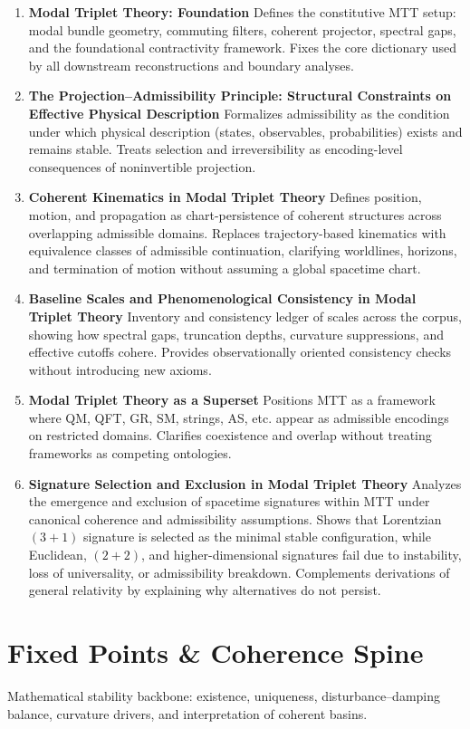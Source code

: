 \documentclass[11pt]{article}
\begin{document}
\begin{enumerate}[leftmargin=*]
\item \textbf{Modal Triplet Theory: Foundation} Defines the constitutive MTT setup: modal bundle geometry, commuting filters, coherent projector, spectral gaps, and the foundational contractivity framework. Fixes the core dictionary used by all downstream reconstructions and boundary analyses.
\item \textbf{The Projection--Admissibility Principle: Structural Constraints on Effective Physical Description} Formalizes admissibility as the condition under which physical description (states, observables, probabilities) exists and remains stable. Treats selection and irreversibility as encoding-level consequences of noninvertible projection.
\item \textbf{Coherent Kinematics in Modal Triplet Theory}
Defines position, motion, and propagation as chart-persistence of coherent structures across overlapping admissible domains. Replaces trajectory-based kinematics with equivalence classes of admissible continuation, clarifying worldlines, horizons, and termination of motion without assuming a global spacetime chart.
\item \textbf{Baseline Scales and Phenomenological Consistency in Modal Triplet Theory} Inventory and consistency ledger of scales across the corpus, showing how spectral gaps, truncation depths, curvature suppressions, and effective cutoffs cohere. Provides observationally oriented consistency checks without introducing new axioms.
\item \textbf{Modal Triplet Theory as a Superset} Positions MTT as a framework where QM, QFT, GR, SM, strings, AS, etc. appear as admissible encodings on restricted domains. Clarifies coexistence and overlap without treating frameworks as competing ontologies.
\item \textbf{Signature Selection and Exclusion in Modal Triplet Theory} 
Analyzes the emergence and exclusion of spacetime signatures within MTT under canonical coherence and admissibility assumptions. Shows that Lorentzian $(3+1)$ signature is selected as the minimal stable configuration, while Euclidean, $(2+2)$, and higher-dimensional signatures fail due to instability, loss of universality, or admissibility breakdown. Complements derivations of general relativity by explaining why alternatives do not persist.

\end{enumerate}

\section{Fixed Points \& Coherence Spine}
Mathematical stability backbone: existence, uniqueness, disturbance–damping balance, curvature drivers, and interpretation of coherent basins.
\end{document}
